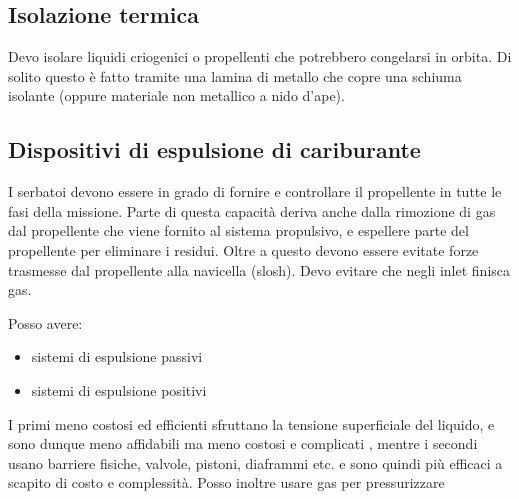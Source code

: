 \documentclass[a4paper]{article}
\begin{document}
    \subsection{Isolazione termica}
    Devo isolare liquidi criogenici o propellenti che potrebbero congelarsi in orbita. 
    Di solito questo è fatto tramite una lamina di metallo che copre una schiuma isolante (oppure materiale non metallico a nido d'ape).
    \subsection{Dispositivi di espulsione di cariburante}
    I serbatoi devono essere in grado di fornire e controllare il propellente in tutte le fasi della missione. 
    Parte di questa capacità deriva anche dalla rimozione di gas dal propellente che viene fornito al sistema propulsivo, e 
    espellere parte del propellente per eliminare i residui. Oltre a questo devono essere evitate forze trasmesse dal propellente alla navicella
    (slosh). Devo evitare che negli inlet finisca gas. 
    
    Posso avere: 
    \begin{itemize}
        \item sistemi di espulsione passivi
        \item sistemi di espulsione positivi
    \end{itemize}
    I primi meno costosi ed efficienti sfruttano la tensione superficiale del liquido, e sono dunque meno affidabili ma meno costosi e complicati
    , mentre i secondi usano barriere fisiche, valvole, pistoni, diaframmi etc. e sono quindi più efficaci a scapito di costo e complessità.
    Posso inoltre usare gas per pressurizzare 
    
\end{document}
